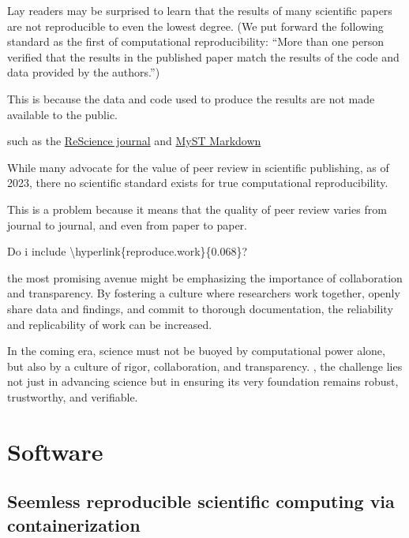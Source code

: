 Lay readers may be surprised to learn that the results of many scientific papers are not reproducible to even the lowest degree. (We put forward the following standard as the first of computational reproducibility: ``More than one person verified that the results in the published paper match the results of the code and data provided by the authors.'') 

This is because the data and code used to produce the results are not made available to the public. 

such as the \href{https://rescience.github.io/}{ReScience journal} and \href{https://jupyterbook.org/en/stable/content/myst.html}{MyST Markdown}

While many advocate for the value of peer review in scientific publishing, as of 2023, there no scientific standard exists for true computational reproducibility. 

This is a problem because it means that the quality of peer review varies from journal to journal, and even from paper to paper. 

Do i include \textbackslash{}hyperlink\{reproduce.work\}\{0.068\}?

the most promising avenue might be emphasizing the importance of collaboration and transparency. By fostering a culture where researchers work together, openly share data and findings, and commit to thorough documentation, the reliability and replicability of work can be increased.

In the coming era, science must not be buoyed by computational power alone, but also by a culture of rigor, collaboration, and transparency.
, the challenge lies not just in advancing science but in ensuring its very foundation remains robust, trustworthy, and verifiable. 

\hypertarget{software}{%
\section{Software}\label{software}}

\hypertarget{seemless-reproducible-scientific-computing-via-containerization}{%
\subsection{Seemless reproducible scientific computing via containerization}\label{seemless-reproducible-scientific-computing-via-containerization}}

